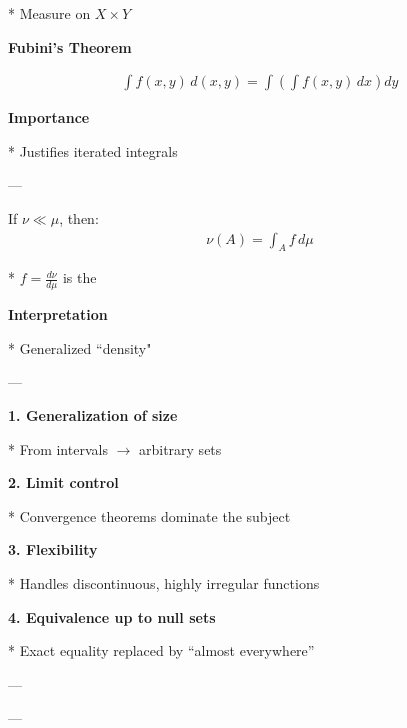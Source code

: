 \documentclass[12pt,a4paper]{report}
\begin{document}
\begin{description}
\begin{description}
* Measure on $X \times Y$

    \item \textbf{Fubini’s Theorem}

\begin{align*}
    \int f(x,y)\,d(x,y) = \int \left(\int f(x,y)\,dx\right) dy
\end{align*}

    \item \textbf{Importance}

* Justifies iterated integrals
	\end{description}

---

\item {}

If $\nu \ll \mu$, then:
\begin{align*}
    \nu(A) = \int_A f \, d\mu
\end{align*}

* $f = \frac{d\nu}{d\mu}$ is the 

\textbf{Interpretation}

* Generalized ``density"

---

\item {}

	\begin{description}
    \item \textbf{1. Generalization of size}

* From intervals $\to$ arbitrary sets

    \item \textbf{2. Limit control}

* Convergence theorems dominate the subject

    \item \textbf{3. Flexibility}

* Handles discontinuous, highly irregular functions

    \item \textbf{4. Equivalence up to null sets}

* Exact equality replaced by “almost everywhere”
	\end{description}

---

\item {}


---
\end{description}
\end{document}
